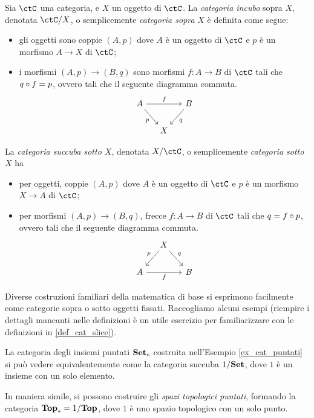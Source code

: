 \begin{definition}\label{def_cat_slice}
	Sia \(\ctC\) una categoria, e \(X\) un oggetto di \(\ctC\).
	La \emph{categoria incubo} sopra \(X\), denotata \(\ctC/X\), o semplicemente \emph{categoria sopra} \(X\) è definita come segue:%
	\begin{itemize}
		\item gli oggetti sono coppie \((A,p)\) dove \(A\) è un oggetto di \(\ctC\) e \(p\) è un morfismo \(A\to X\) di \(\ctC\);
		\item i morfismi \((A,p)\to(B,q)\) sono morfismi \(f:A\to B\) di \(\ctC\) tali che \(q\circ f=p\), ovvero tali che il seguente diagramma commuta.
		      \[
			      \begin{tikzcd}[column sep=small]
				      A \ar{rr}{f} \ar{dr}[swap]{p} && B \ar{dl}{q} \\
				      & X
			      \end{tikzcd}
		      \]
	\end{itemize}

	La \emph{categoria succuba sotto \(X\)}, denotata \(X/\ctC\), o semplicemente \emph{categoria sotto} \(X\) ha
	\begin{itemize}
		\item per oggetti, coppie \((A,p)\) dove \(A\) è un oggetto di \(\ctC\) e \(p\) è un morfismo \(X\to A\) di \(\ctC\);
		\item per morfismi \((A,p)\to(B,q)\), frecce \(f:A\to B\) di \(\ctC\) tali che \(q=f\circ p\), ovvero tali che il seguente diagramma commuta.
		      \[
			      \begin{tikzcd}[column sep=small]
				      & X \ar{dl}[swap]{p} \ar{dr}{q}  \\
				      A \ar{rr}[swap]{f} && B
			      \end{tikzcd}
		      \]
	\end{itemize}
\end{definition}
Diverse costruzioni familiari della matematica di base si esprimono facilmente come categorie sopra o sotto oggetti fissati. Raccogliamo alcuni esempi (riempire i dettagli mancanti nelle definizioni è un utile esercizio per familiarizzare con le definizioni in \ref{def_cat_slice}).
\begin{example}\label{def_spazi_pun_succuba}
	La categoria degli insiemi puntati \(\mathbf{Set}_*\) costruita nell'Esempio \ref{ex_cat_puntati} si può vedere equivalentemente come la categoria succuba \(1/\mathbf{Set}\), dove \(1\) è un insieme con un solo elemento.

	In maniera simile, si possono costruire gli \emph{spazi topologici puntati}, formando la categoria \(\mathbf{Top}_*=1/\mathbf{Top}\), dove \(1\) è uno spazio topologico con un solo punto.
\end{example}
